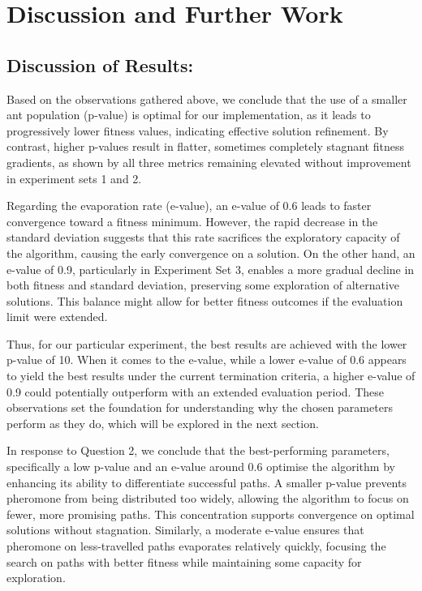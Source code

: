 \documentclass[sigconf]{acmart}
\begin{document}
    \section{Discussion and Further Work}
        \subsection{Discussion of Results:}
            Based on the observations gathered above, we conclude that the use of a smaller ant population (p-value) is optimal for our implementation, as it leads to progressively lower fitness values, indicating effective solution refinement. By contrast, higher p-values result in flatter, sometimes completely stagnant fitness gradients, as shown by all three metrics remaining elevated without improvement in experiment sets 1 and 2.\newline
    
            Regarding the evaporation rate (e-value), an e-value of 0.6 leads to faster convergence toward a fitness minimum. However, the rapid decrease in the standard deviation suggests that this rate sacrifices the exploratory capacity of the algorithm, causing the early convergence on a solution. On the other hand, an e-value of 0.9, particularly in Experiment Set 3, enables a more gradual decline in both fitness and standard deviation, preserving some exploration of alternative solutions. This balance might allow for better fitness outcomes if the evaluation limit were extended.\newline
            
            Thus, for our particular experiment, the best results are achieved with the lower p-value of 10. When it comes to the e-value, while a lower e-value of 0.6 appears to yield the best results under the current termination criteria, a higher e-value of 0.9 could potentially outperform with an extended evaluation period. These observations set the foundation for understanding why the chosen parameters perform as they do, which will be explored in the next section.\newline
            
            In response to Question 2, we conclude that the best-performing parameters, specifically a low p-value and an e-value around 0.6 optimise the algorithm by enhancing its ability to differentiate successful paths. A smaller p-value prevents pheromone from being distributed too widely, allowing the algorithm to focus on fewer, more promising paths. This concentration supports convergence on optimal solutions without stagnation. Similarly, a moderate e-value ensures that pheromone on less-travelled paths evaporates relatively quickly, focusing the search on paths with better fitness while maintaining some capacity for exploration.\newline
            
\end{document}
